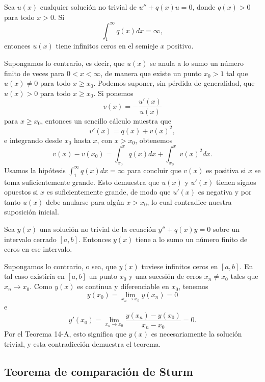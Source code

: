 \begin{theorem}
	Sea $u(x)$ cualquier solución no trivial de $u'' + q(x)u = 0$, donde $q(x) > 0$ para todo $x > 0$. Si
	$$\int_{1}^{\infty} q(x)  dx = \infty,$$
	entonces $u(x)$ tiene infinitos ceros en el semieje $x$ positivo.
\end{theorem}
\begin{demo}
	Supongamos lo contrario, es decir, que $u(x)$ se anula a lo sumo un número finito de veces para $0 < x < \infty$, de manera que existe un punto $x_0 > 1$ tal que $u(x) \neq 0$ para todo $x \geq x_0$. Podemos suponer, sin pérdida de generalidad, que $u(x) > 0$ para todo $x \geq x_0$. Si ponemos
	$$v(x) = -\frac{u'(x)}{u(x)}$$
	para $x \geq x_0$, entonces un sencillo cálculo muestra que
	$$v'(x) = q(x) + v(x)^2,$$
	e integrando desde $x_0$ hasta $x$, con $x > x_0$, obtenemos
	$$v(x) - v(x_0) = \int_{x_0}^x q(x)  dx + \int_{x_0}^x v(x)^2  dx.$$
	Usamos la hipótesis $\int_{1}^{\infty} q(x)  dx = \infty$ para concluir que $v(x)$ es positiva si $x$ se toma suficientemente grande. Esto demuestra que $u(x)$ y $u'(x)$ tienen signos opuestos si $x$ es suficientemente grande, de modo que $u'(x)$ es negativa y por tanto $u(x)$ debe anularse para algún $x > x_0$, lo cual contradice nuestra suposición inicial.
\end{demo}

\begin{theorem}
	Sea $y(x)$ una solución no trivial de la ecuación $y'' + q(x)y = 0$ sobre un intervalo cerrado $[a, b]$. Entonces $y(x)$ tiene a lo sumo un número finito de ceros en ese intervalo.
\end{theorem}
\begin{demo}
	Supongamos lo contrario, o sea, que $y(x)$ tuviese infinitos ceros en $[a, b]$. En tal caso existiría en $[a, b]$ un punto $x_0$ y una sucesión de ceros $x_n \neq x_0$ tales que $x_n \to x_0$. Como $y(x)$ es continua y diferenciable en $x_0$, tenemos
	$$y(x_0) = \lim_{x_n \to x_0} y(x_n) = 0$$
	e
	$$y'(x_0) = \lim_{x_n \to x_0} \frac{y(x_n) - y(x_0)}{x_n - x_0} = 0.$$
	Por el Teorema 14-A, esto significa que $y(x)$ es necesariamente la solución trivial, y esta contradicción demuestra el teorema.
\end{demo}

\subsection{Teorema de comparación de Sturm}

